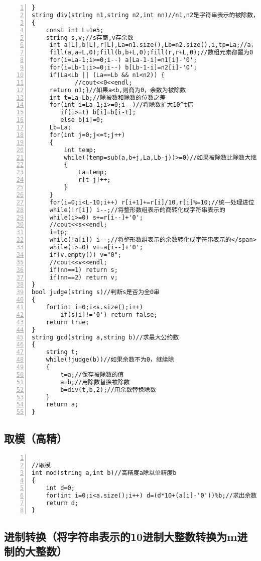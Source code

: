 \begin{lstlisting}[language={[ANSI]C},numbers=left]
}
string div(string n1,string n2,int nn)//n1,n2是字符串表示的被除数，除数,nn是选择返回商还是余数
{
    const int L=1e5;
    string s,v;//s存商,v存余数
     int a[L],b[L],r[L],La=n1.size(),Lb=n2.size(),i,tp=La;//a，b是整形数组表示被除数，除数，tp保存被除数的长度
     fill(a,a+L,0);fill(b,b+L,0);fill(r,r+L,0);//数组元素都置为0
     for(i=La-1;i>=0;i--) a[La-1-i]=n1[i]-'0';
     for(i=Lb-1;i>=0;i--) b[Lb-1-i]=n2[i]-'0';
     if(La<Lb || (La==Lb && n1<n2)) {
            //cout<<0<<endl;
     return n1;}//如果a<b,则商为0，余数为被除数
     int t=La-Lb;//除被数和除数的位数之差
     for(int i=La-1;i>=0;i--)//将除数扩大10^t倍
        if(i>=t) b[i]=b[i-t];
        else b[i]=0;
     Lb=La;
     for(int j=0;j<=t;j++)
     {
         int temp;
         while((temp=sub(a,b+j,La,Lb-j))>=0)//如果被除数比除数大继续减
         {
             La=temp;
             r[t-j]++;
         }
     }
     for(i=0;i<L-10;i++) r[i+1]+=r[i]/10,r[i]%=10;//统一处理进位
     while(!r[i]) i--;//将整形数组表示的商转化成字符串表示的
     while(i>=0) s+=r[i--]+'0';
     //cout<<s<<endl;
     i=tp;
     while(!a[i]) i--;//将整形数组表示的余数转化成字符串表示的</span>
     while(i>=0) v+=a[i--]+'0';
     if(v.empty()) v="0";
     //cout<<v<<endl;
     if(nn==1) return s;
     if(nn==2) return v;
}
bool judge(string s)//判断s是否为全0串
{
    for(int i=0;i<s.size();i++)
        if(s[i]!='0') return false;
    return true;
}
string gcd(string a,string b)//求最大公约数
{
    string t;
    while(!judge(b))//如果余数不为0，继续除
    {
        t=a;//保存被除数的值
        a=b;//用除数替换被除数
        b=div(t,b,2);//用余数替换除数
    }
    return a;
}
\end{lstlisting}

\subsection{取模（高精）}


\begin{lstlisting}[language={[ANSI]C},numbers=left]

//取模
int mod(string a,int b)//高精度a除以单精度b
{
    int d=0;
    for(int i=0;i<a.size();i++) d=(d*10+(a[i]-'0'))%b;//求出余数
    return d;
}  
\end{lstlisting}

\subsection{进制转换（将字符串表示的10进制大整数转换为m进制的大整数）}


